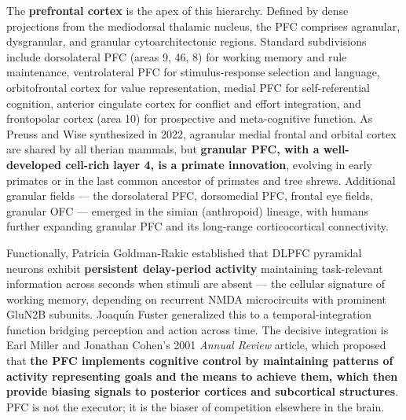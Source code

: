 The \textbf{prefrontal cortex} is the apex of this hierarchy. Defined by dense projections from the mediodorsal thalamic nucleus, the PFC comprises agranular, dysgranular, and granular cytoarchitectonic regions. Standard subdivisions include dorsolateral PFC (areas 9, 46, 8) for working memory and rule maintenance, ventrolateral PFC for stimulus-response selection and language, orbitofrontal cortex for value representation, medial PFC for self-referential cognition, anterior cingulate cortex for conflict and effort integration, and frontopolar cortex (area 10) for prospective and meta-cognitive function. As Preuss and Wise synthesized in 2022, agranular medial frontal and orbital cortex are shared by all therian mammals, but \textbf{granular PFC, with a well-developed cell-rich layer 4, is a primate innovation}, evolving in early primates or in the last common ancestor of primates and tree shrews. Additional granular fields --- the dorsolateral PFC, dorsomedial PFC, frontal eye fields, granular OFC --- emerged in the simian (anthropoid) lineage, with humans further expanding granular PFC and its long-range corticocortical connectivity.

Functionally, Patricia Goldman-Rakic established that DLPFC pyramidal neurons exhibit \textbf{persistent delay-period activity} maintaining task-relevant information across seconds when stimuli are absent --- the cellular signature of working memory, depending on recurrent NMDA microcircuits with prominent GluN2B subunits. Joaquín Fuster generalized this to a temporal-integration function bridging perception and action across time. The decisive integration is Earl Miller and Jonathan Cohen's 2001 \emph{Annual Review} article, which proposed that \textbf{the PFC implements cognitive control by maintaining patterns of activity representing goals and the means to achieve them, which then provide biasing signals to posterior cortices and subcortical structures}. PFC is not the executor; it is the biaser of competition elsewhere in the brain.

